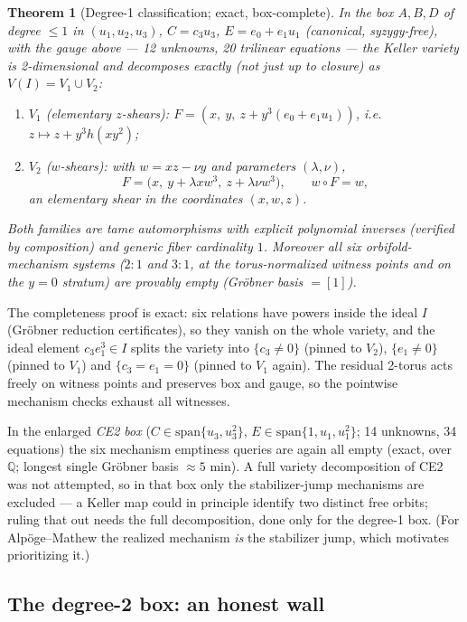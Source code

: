 \documentclass[11pt]{article}
\newtheorem{theorem}{Theorem}[section]
\theoremstyle{definition}
\theoremstyle{remark}
\newcommand{\Q}{\mathbb{Q}}
\begin{document}
\begin{theorem}[Degree-1 classification; exact, box-complete]
\label{thm:213class}
In the box $A,B,D$ of degree $\le 1$ in $(u_1,u_2,u_3)$, $C = c_3u_3$,
$E = e_0 + e_1u_1$ (canonical, syzygy-free), with the gauge above ---
12 unknowns, 20 trilinear equations --- the Keller variety is
2-dimensional and decomposes exactly (not just up to closure) as
$V(I) = V_1 \cup V_2$:
\begin{enumerate}
\item $V_1$ (elementary $z$-shears):
 $F = (x,\ y,\ z + y^3(e_0 + e_1u_1))$, i.e.\
 $z \mapsto z + y^3h(xy^2)$;
\item $V_2$ ($w$-shears): with $w = xz - \nu y$ and parameters
 $(\lambda,\nu)$,
 \[
 F = \bigl(x,\ y + \lambda x w^3,\ z + \lambda\nu w^3\bigr),
 \qquad w\circ F = w,
 \]
 an elementary shear in the coordinates $(x,w,z)$.
\end{enumerate}
Both families are tame automorphisms with explicit polynomial inverses
(verified by composition) and generic fiber cardinality $1$. Moreover
all six orbifold-mechanism systems ($2{:}1$ and $3{:}1$, at the
torus-normalized witness points and on the $y=0$ stratum) are provably
empty (Gr\"obner basis $=[1]$).
\end{theorem}

The completeness proof is exact: six relations have powers inside the
ideal $I$ (Gr\"obner reduction certificates), so they vanish on the
whole variety, and the ideal element $c_3e_1^3 \in I$ splits the variety
into $\{c_3\ne0\}$ (pinned to $V_2$), $\{e_1\ne0\}$ (pinned to $V_1$)
and $\{c_3 = e_1 = 0\}$ (pinned to $V_1$ again). The residual 2-torus
acts freely on witness points and preserves box and gauge, so the
pointwise mechanism checks exhaust all witnesses.

In the enlarged \emph{CE2 box} ($C \in \mathrm{span}\{u_3,u_3^2\}$,
$E \in \mathrm{span}\{1,u_1,u_1^2\}$; 14 unknowns, 34 equations) the six
mechanism emptiness queries are again all empty (exact, over $\Q$;
longest single Gr\"obner basis $\approx 5$ min). A full variety
decomposition of CE2 was not attempted, so in that box only the
stabilizer-jump mechanisms are excluded --- a Keller map could in
principle identify two distinct free orbits; ruling that out needs the
full decomposition, done only for the degree-1 box. (For
Alp\"oge--Mathew the realized mechanism \emph{is} the stabilizer jump,
which motivates prioritizing it.)

\subsection{The degree-2 box: an honest wall}\label{sec:213wall}
\end{document}
